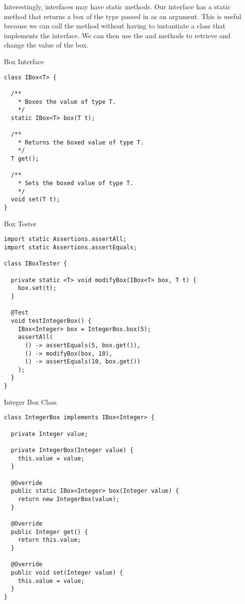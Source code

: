 Interestingly, interfaces may have static methods. Our  interface has a static  method that returns a box of the type passed in as an argument. This is useful because we can call the  method without having to instantiate a class that implements the  interface. We can then use the  and  methods to retrieve and change the value of the box.

\begin{cl}{Box Interface}
\begin{lstlisting}[language=MyJava]
class IBox<T> {
  
  /**
    * Boxes the value of type T.
    */
  static IBox<T> box(T t);

  /**
    * Returns the boxed value of type T.
    */
  T get();

  /**
    * Sets the boxed value of type T.
    */
  void set(T t);
}
\end{lstlisting}
\end{cl}

\begin{cl}{Box Tester} 
\begin{lstlisting}[language=MyJava]
import static Assertions.assertAll;
import static Assertions.assertEquals;

class IBoxTester {

  private static <T> void modifyBox(IBox<T> box, T t) {
    box.set(t);
  }
  
  @Test
  void testIntegerBox() {
    IBox<Integer> box = IntegerBox.box(5);
    assertAll(
      () -> assertEquals(5, box.get()),
      () -> modifyBox(box, 10),
      () -> assertEquals(10, box.get())
    );
  }
}
\end{lstlisting}
\end{cl}

\begin{cl}{Integer Box Class}
\begin{lstlisting}[language=MyJava]
class IntegerBox implements IBox<Integer> {
  
  private Integer value;
  
  private IntegerBox(Integer value) {
    this.value = value;
  }
  
  @Override
  public static IBox<Integer> box(Integer value) {
    return new IntegerBox(value);
  }
  
  @Override
  public Integer get() {
    return this.value;
  }
  
  @Override
  public void set(Integer value) {
    this.value = value;
  }
}
\end{lstlisting}
\end{cl}

